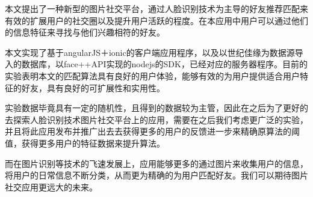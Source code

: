 

本文提出了一种新型的图片社交平台，通过人脸识别技术为主导的好友推荐匹配来有效的扩展用户的社交圈以及提升用户活跃的程度。在本应用中用户可以通过他们的信息特征来寻找与他们兴趣相符的好友。

本文实现了基于angularJS＋ionic的客户端应用程序，以及以世纪佳缘为数据源导入的数据库，以face++API实现的nodejs的SDK，已经对应的服务器程序。目前的实验表明本文的匹配算法具有良好的用户体验，能够有效的为用户提供适合用户特征的好友，具有良好的可扩展性和实用性。

实验数据毕竟具有一定的随机性，且得到的数据较为主管，因此在之后为了更好的去探索人脸识别技术图片社交平台上的应用，需要在之后我们考虑更广泛的实验，并且将此应用发布并推广出去去获得更多的用户的反馈进一步来精确原算法的阈值，获得更多用户的特征数据来提升算法。

而在图片识别等技术的飞速发展上，应用能够更多的通过图片来收集用户的信息，将用户的日常信息不断分类，从而更为精确的为用户匹配好友。我们可以期待图片社交应用更远大的未来。



